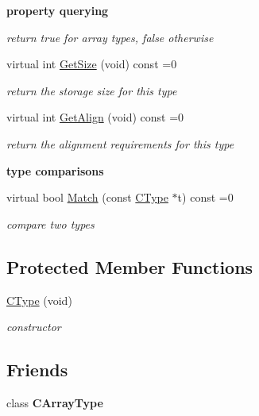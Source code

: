 \begin{Indent}{\bf property querying}
\begin{DoxyCompactItemize}
\begin{DoxyCompactList}\small\item\em return {\itshape true} for array types, {\itshape false} otherwise \end{DoxyCompactList}\item 
virtual int \hyperlink{classCType_a0332965ec6286e3da7120acb0246b8c5}{Get\-Size} (void) const =0
\begin{DoxyCompactList}\small\item\em return the storage size for this type \end{DoxyCompactList}\item 
virtual int \hyperlink{classCType_ac90dd48c9401547e303d547bace4a1a4}{Get\-Align} (void) const =0
\begin{DoxyCompactList}\small\item\em return the alignment requirements for this type \end{DoxyCompactList}\end{DoxyCompactItemize}
\end{Indent}
\begin{Indent}{\bf type comparisons}\par
\begin{DoxyCompactItemize}
\item 
virtual bool \hyperlink{classCType_a0af203630037a02b9bb98fd996e65492}{Match} (const \hyperlink{classCType}{C\-Type} $\ast$t) const =0
\begin{DoxyCompactList}\small\item\em compare two types \end{DoxyCompactList}\end{DoxyCompactItemize}
\end{Indent}
\subsection*{Protected Member Functions}
\begin{DoxyCompactItemize}
\item 
\hypertarget{classCType_a248bf84e1c34b5d449c195476a4c683c}{\hyperlink{classCType_a248bf84e1c34b5d449c195476a4c683c}{C\-Type} (void)}\label{classCType_a248bf84e1c34b5d449c195476a4c683c}

\begin{DoxyCompactList}\small\item\em constructor \end{DoxyCompactList}\end{DoxyCompactItemize}
\subsection*{Friends}
\begin{DoxyCompactItemize}
\item 
\hypertarget{classCType_aa8444dcbf35b4efcfd12df8b6d4b75a9}{class {\bfseries C\-Array\-Type}}\label{classCType_aa8444dcbf35b4efcfd12df8b6d4b75a9}

\end{DoxyCompactItemize}


